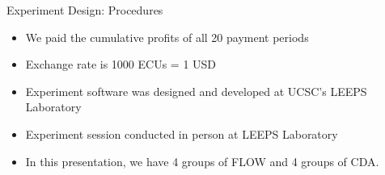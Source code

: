 \documentclass[10pt]{beamer}
\begin{document}
\begin{frame}{Experiment Design: Procedures}
    \begin{itemize}
        \item We paid the cumulative profits of all 20 payment periods
        \item Exchange rate is 1000 ECUs = 1 USD
        \item Experiment software was designed and developed at UCSC's LEEPS Laboratory
        \item Experiment session conducted in person at LEEPS Laboratory
        \item In this presentation, we have 4 groups of FLOW and 4 groups of CDA. 
    \end{itemize}
\end{frame}
\end{document}
